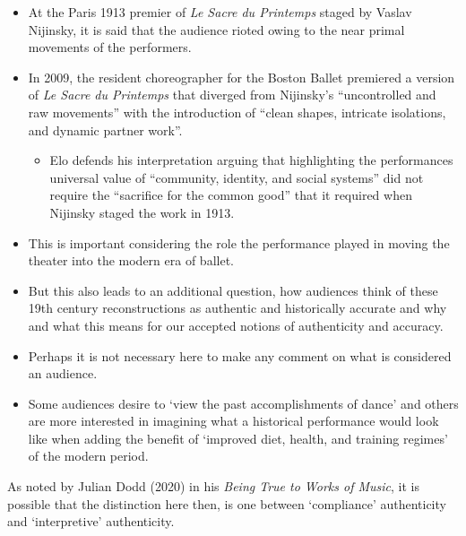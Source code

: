 \documentclass[
  letterpaper,
  DIV=11,
  numbers=noendperiod]{scrreprt}
\providecommand{\tightlist}{%
  \setlength{\itemsep}{0pt}\setlength{\parskip}{0pt}}\usepackage{longtable,booktabs,array}
\begin{document}
\begin{tcolorbox}[enhanced jigsaw, arc=.35mm, breakable, rightrule=.15mm, colback=white, colframe=quarto-callout-important-color-frame, bottomrule=.15mm, leftrule=.75mm, opacityback=0, toprule=.15mm, left=2mm]
\begin{tcolorbox}[enhanced jigsaw, arc=.35mm, breakable, rightrule=.15mm, colback=white, colframe=quarto-callout-tip-color-frame, bottomrule=.15mm, leftrule=.75mm, opacityback=0, toprule=.15mm, left=2mm]
\begin{itemize}
  may attempt to reveal.
\item
  At the Paris 1913 premier of \emph{Le Sacre du Printemps} staged by
  Vaslav Nijinsky, it is said that the audience rioted owing to the near
  primal movements of the performers.
\item
  In 2009, the resident choreographer for the Boston Ballet premiered a
  version of \emph{Le Sacre du Printemps} that diverged from Nijinsky's
  ``uncontrolled and raw movements'' with the introduction of ``clean
  shapes, intricate isolations, and dynamic partner work''.

  \begin{itemize}
  \tightlist
  \item
    Elo defends his interpretation arguing that highlighting the
    performances universal value of ``community, identity, and social
    systems'' did not require the ``sacrifice for the common good'' that
    it required when Nijinsky staged the work in 1913.
  \end{itemize}
\item
  This is important considering the role the performance played in
  moving the theater into the modern era of ballet.
\item
  But this also leads to an additional question, how audiences think of
  these 19th century reconstructions as authentic and historically
  accurate and why and what this means for our accepted notions of
  authenticity and accuracy.
\item
  Perhaps it is not necessary here to make any comment on what is
  considered an audience.
\item
  Some audiences desire to `view the past accomplishments of dance' and
  others are more interested in imagining what a historical performance
  would look like when adding the benefit of `improved diet, health, and
  training regimes' of the modern period.
\end{itemize}

As noted by Julian Dodd (2020) in his \emph{Being True to Works of
Music}, it is possible that the distinction here then, is one between
`compliance' authenticity and `interpretive' authenticity.


\end{tcolorbox}
\end{tcolorbox}
\end{document}
